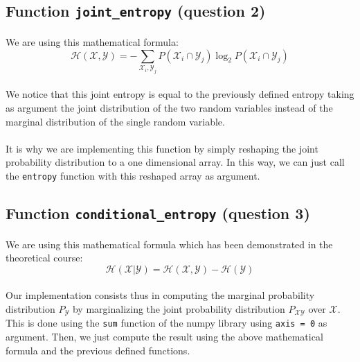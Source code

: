\documentclass[a4paper, 11pt, oneside]{article}
\begin{document}
\subsection{Function \texttt{joint\_entropy} (question 2)}

\paragraph{}We are using this mathematical formula: 
$$ \mathcal{H}(\mathcal{X}, \mathcal{Y}) = - \sum_{\mathcal{X}_i, \mathcal{Y}_j} P(\mathcal{X}_i \cap \mathcal{Y}_j) \log_2{P(\mathcal{X}_i \cap \mathcal{Y}_j)} $$

\paragraph{}We notice that this joint entropy is equal to the previously defined entropy taking as argument the joint distribution of the two random variables instead of the marginal distribution of the single random variable.

\paragraph{}It is why we are implementing this function by simply reshaping the joint probability distribution to a one dimensional array. In this way, we can just call the \texttt{entropy} function with this reshaped array as argument.

\subsection{Function \texttt{conditional\_entropy} (question 3)}

\paragraph{}We are using this mathematical formula which has been demonstrated in the theoretical course:
$$ \mathcal{H}(\mathcal{X} | \mathcal{Y}) = \mathcal{H}(\mathcal{X} , \mathcal{Y}) - \mathcal{H}(\mathcal{Y}) $$

\paragraph{}Our implementation consists thus in computing the marginal probability distribution $P_\mathcal{Y}$ by marginalizing the joint probability distribution $P_{\mathcal{XY}}$ over $\mathcal{X}$. This is done using the \texttt{sum} function of the numpy library using \texttt{axis = 0} as argument. Then, we just compute the result using the above mathematical formula and the previous defined functions.
\end{document}
